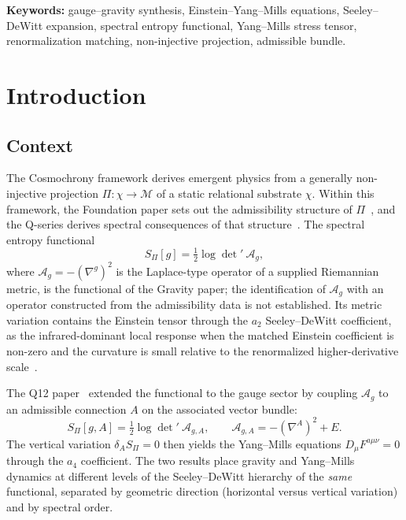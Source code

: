 \documentclass[12pt,a4paper]{article}
\theoremstyle{remark}
\begin{document}
  \textbf{Keywords:} gauge--gravity synthesis, Einstein--Yang--Mills equations,
  Seeley--DeWitt expansion, spectral entropy functional, Yang--Mills stress tensor,
  renormalization matching, non-injective projection, admissible bundle.

  \clearpage
  \tableofcontents

  \clearpage
  \section{Introduction}
    \label{sec:intro}

    \subsection{Context}
      \label{ssec:context}

      The Cosmochrony framework derives emergent physics from a generally non-injective
      projection $\Pi\colon\chi\to\mathcal{M}$ of a static relational substrate $\chi$.
      Within this framework, the Foundation paper sets out the admissibility structure
      of $\Pi$~\cite{Beau2026m}, and the Q-series derives spectral consequences of that
      structure~\cite{Beau2026q1,Beau2026q2}.
      The spectral entropy functional
      \[
        S_\Pi[g] = \tfrac{1}{2}\log\det'\ \mathcal{A}_g,
      \]
      where $\mathcal{A}_g = -(\nabla^g)^2$ is the Laplace-type operator of a supplied Riemannian metric, is the
      functional of the Gravity paper; the identification of $\mathcal{A}_g$ with an operator constructed from the
      admissibility data is not established.
      Its metric variation contains the Einstein tensor through the $a_2$ Seeley--DeWitt coefficient, as the
      infrared-dominant local response when the matched Einstein coefficient is non-zero and the curvature is small
      relative to the renormalized higher-derivative scale~\cite{Beau2026h}.

      The Q12 paper~\cite{Beau2026q12} extended the functional to the gauge sector
      by coupling $\mathcal{A}_g$ to an admissible connection $A$ on the associated
      vector bundle:
      \[
        S_\Pi[g,A] = \tfrac{1}{2}\log\det'\ \mathcal{A}_{g,A},
        \qquad
        \mathcal{A}_{g,A} = -(\nabla^A)^2 + E.
      \]
      The vertical variation $\delta_A S_\Pi = 0$ then yields the Yang--Mills equations
      $D_\mu F^{a\mu\nu} = 0$ through the $a_4$ coefficient.
      The two results place gravity and Yang--Mills dynamics at different levels of
      the Seeley--DeWitt hierarchy of the \emph{same} functional, separated by geometric
      direction (horizontal versus vertical variation) and by spectral order.
\end{document}
